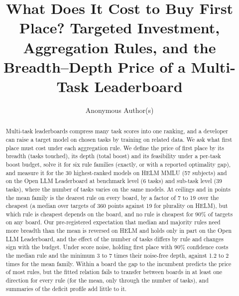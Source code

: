 \documentclass{article}
\title{What Does It Cost to Buy First Place? Targeted Investment, Aggregation Rules, and the Breadth--Depth Price of a Multi-Task Leaderboard}
\author{Anonymous Author(s)}
\begin{document}
\maketitle

\begin{abstract}
Multi-task leaderboards compress many task scores into one ranking, and a developer can raise a target model on chosen tasks by training on related data. We ask what first place must cost under each aggregation rule. We define the price of first place by its breadth (tasks touched), its depth (total boost) and its feasibility under a per-task boost budget, solve it for six rule families (exactly, or with a reported optimality gap), and measure it for the 30 highest-ranked models on HELM MMLU (57 subjects) and on the Open LLM Leaderboard at benchmark level (6 tasks) and sub-task level (39 tasks), where the number of tasks varies on the same models. At ceilings and in points the mean family is the dearest rule on every board, by a factor of 7 to 19 over the cheapest (a median over targets of 360 points against 19 for plurality on HELM), but which rule is cheapest depends on the board, and no rule is cheapest for 90\% of targets on any board. Our pre-registered expectation that median and majority rules need more breadth than the mean is reversed on HELM and holds only in part on the Open LLM Leaderboard, and the effect of the number of tasks differs by rule and changes sign with the budget. Under score noise, holding first place with 90\% confidence costs the median rule and the minimum 3 to 7 times their noise-free depth, against 1.2 to 2 times for the mean family. Within a board the gap to the incumbent predicts the price of most rules, but the fitted relation fails to transfer between boards in at least one direction for every rule (for the mean, only through the number of tasks), and summaries of the deficit profile add little to it.
\end{abstract}















\end{document}

